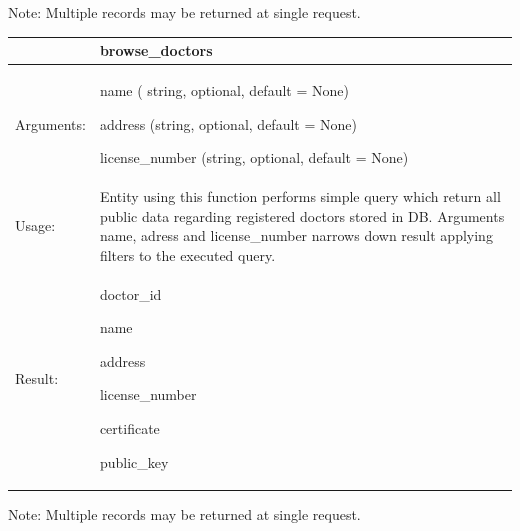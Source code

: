 Note: Multiple records may be returned at single request.
    \begin{longtable}{| p{3cm} | p{10.75cm} |}
    \hline
     & browse\_doctors \\ \hline
    Arguments: &  \begin{packed_enum}
    	\item name ( string, optional, default = None)
		\item address (string, optional, default = None)
		\item license\_number (string, optional, default = None)

	\end{packed_enum}     \\ \hline
    Usage: & Entity using this function performs simple query which return all public data regarding registered doctors stored in DB. Arguments name, adress and license\_number narrows down result applying filters to the executed query. \\ \hline
    Result: & \begin{packed_enum}
    	\item doctor\_id
		\item name
		\item address
		\item license\_number
		\item certificate
		\item public\_key
	\end{packed_enum}     \\ \hline	
    \end{longtable}

Note: Multiple records may be returned at single request.

\newpage

